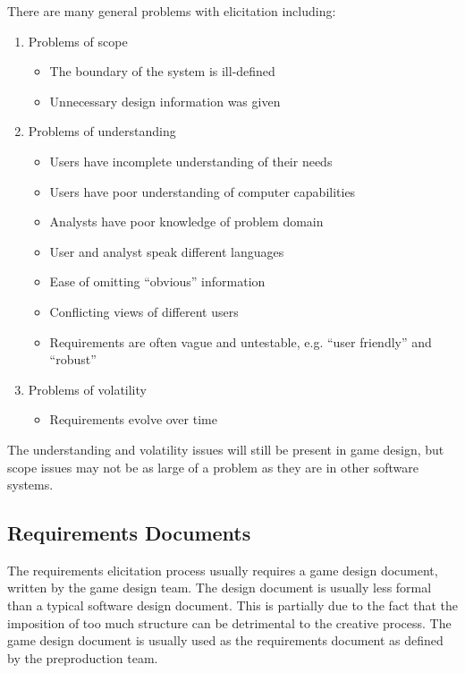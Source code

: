 There are many general problems with elicitation including\cite{mcdermid1989requirements}:
\begin{enumerate}
	\item Problems of scope
	\begin{itemize}
		\item The boundary of the system is ill-defined
		\item Unnecessary design information was given
	\end{itemize}
	\item Problems of understanding
	\begin{itemize}
		\item Users have incomplete understanding of their needs
		\item Users have poor understanding of computer capabilities
		\item Analysts have poor knowledge of problem domain
		\item User and analyst speak different languages
		\item Ease of omitting ``obvious'' information
		\item Conflicting views of different users
		\item Requirements are often vague and untestable, e.g. ``user friendly'' and ``robust''
	\end{itemize}
	\item Problems of volatility
	\begin{itemize}
		\item Requirements evolve over time
	\end{itemize}
\end{enumerate}
The understanding and volatility issues will still be present in game design, but scope issues may not be as large of a problem as they are in other software systems.

\subsection{Requirements Documents}

The requirements elicitation process usually requires a game design document, written by the game design team. The design document is usually less formal than a typical software design document\cite{callele2005requirements}. This is partially due to the fact that the imposition of too much structure can be detrimental to the creative process. The game design document is usually used as the requirements document as defined by the preproduction team\cite{callele2005requirements}. 

